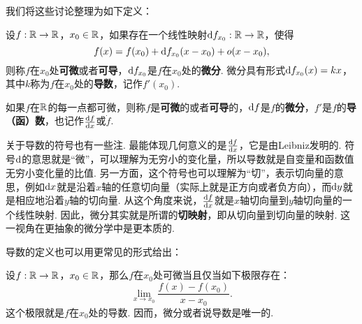 \begin{center}
\end{center}

我们将这些讨论整理为如下定义：

\begin{definition}[微分，导数]
    设$f:\mathbb{R}\to\mathbb{R}$，$x_0\in\mathbb{R}$，如果存在一个线性映射$\mathrm{d} f_{x_0}:\mathbb{R}\to\mathbb{R}$，使得
    \[
        f(x)=f(x_0)+\mathrm{d} f_{x_0}(x-x_0)+o(x-x_0),
    \]
    则称$f$在$x_0$处\textbf{可微}或者\textbf{可导}，$\mathrm{d} f_{x_0}$是$f$在$x_0$处的\textbf{微分}. 微分具有形式$\mathrm{d} f_{x_0}(x)=kx$，其中$k$称为$f$在$x_0$处的\textbf{导数}，记作$f'(x_0)$.

    如果$f$在$\mathbb{R}$的每一点都可微，则称$f$是\textbf{可微}的或者\textbf{可导}的，$\mathrm{d} f$是$f$的\textbf{微分}，$f'$是$f$的\textbf{导（函）数}，也记作$\frac{\mathrm{d} f}{\mathrm{d} x}$或$\dot{f}$.
\end{definition}
关于导数的符号也有一些注. 最能体现几何意义的是$\frac{\mathrm{d} f}{\mathrm{d} x}$，它是由Leibniz发明的. 符号$\mathrm{d}$的意思就是“微”，可以理解为无穷小的变化量，所以导数就是自变量和函数值无穷小变化量的比值. 另一方面，这个符号也可以理解为“切”，表示切向量的意思，例如$\mathrm{d} x$就是沿着$x$轴的任意切向量（实际上就是正方向或者负方向），而$\mathrm{d} y$就是相应地沿着$y$轴的切向量. 从这个角度来说，$\frac{\mathrm{d} f}{\mathrm{d} x}$就是$x$轴切向量到$y$轴切向量的一个线性映射. 因此，微分其实就是所谓的\textbf{切映射}，即从切向量到切向量的映射. 这一视角在更抽象的微分学中是更本质的. 

导数的定义也可以用更常见的形式给出：

\begin{proposition}\label{prop:derivative}
    设$f:\mathbb{R}\to\mathbb{R}$，$x_0\in\mathbb{R}$，那么$f$在$x_0$处可微当且仅当如下极限存在：
    \[
        \lim_{x\to x_0}\frac{f(x)-f(x_0)}{x-x_0}.
    \]
    这个极限就是$f$在$x_0$处的导数. 因而，微分或者说导数是唯一的. 
\end{proposition}

